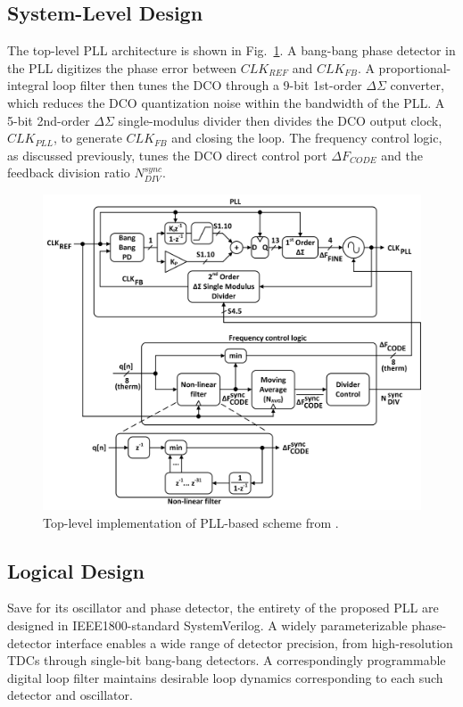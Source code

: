 \documentclass[twoside,9pt,journal,letterpage]{IEEEtran}
\begin{document}
\subsection{System-Level Design}
The top-level PLL architecture is shown in Fig.\ \ref{fig:pll_model}. A bang-bang phase detector in the PLL digitizes the phase error between $CLK_{REF}$ and $CLK_{FB}$. A proportional-integral loop filter then tunes the DCO through a 9-bit 1st-order $\Delta\Sigma$ converter, which reduces the DCO quantization noise within the bandwidth of the PLL. A 5-bit 2nd-order $\Delta\Sigma$ single-modulus divider then divides the DCO output clock, $CLK_{PLL}$, to generate $CLK_{FB}$ and closing the loop. The frequency control logic, as discussed previously, tunes the DCO direct control port $\Delta F_{CODE}$ and the feedback division ratio $N_{DIV}^{sync}$.

\vspace{-10pt}
\begin{figure}[h]
	\centering
	\includegraphics[width=\columnwidth]{fig_pll_model}
	\caption{Top-level implementation of PLL-based scheme from \cite{hashimoto2018}.}
	\label{fig:pll_model}
\end{figure}

\vspace{-7pt}
\subsection{Logical Design}

Save for its oscillator and phase detector, the entirety of the proposed PLL are designed in IEEE1800-standard SystemVerilog. A widely parameterizable phase-detector interface enables a wide range of detector precision, from high-resolution TDCs through single-bit bang-bang detectors. A correspondingly programmable digital loop filter maintains desirable loop dynamics corresponding to each such detector and oscillator. 
\end{document}
